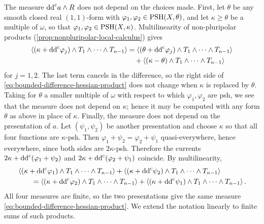 The measure $\mathrm{dd}^{\mathrm{c}} a\wedge R$ does not depend on the choices made. First, let $\theta$ be any smooth closed real $(1,1)$-form with $\varphi_1,\varphi_2\in\mathrm{PSH}(X,\theta)$, and let $\kappa\geq\theta$ be a multiple of $\omega$, so that $\varphi_1,\varphi_2\in\mathrm{PSH}(X,\kappa)$. Multilinearity of non-pluripolar products (\cref{prop:nonpluripolar-local-calculus}) gives
\[
 \begin{aligned}
 \left\langle(\kappa+\mathrm{dd}^{\mathrm{c}}\varphi_j)\wedge T_1\wedge\cdots\wedge T_{n-1}\right\rangle
 &=\left\langle(\theta+\mathrm{dd}^{\mathrm{c}}\varphi_j)\wedge T_1\wedge\cdots\wedge T_{n-1}\right\rangle\\
 &\quad+\left\langle(\kappa-\theta)\wedge T_1\wedge\cdots\wedge T_{n-1}\right\rangle
 \end{aligned}
\]
for $j=1,2$. The last term cancels in the difference, so the right side of \eqref{eq:bounded-difference-hessian-product} does not change when $\kappa$ is replaced by $\theta$. Taking for $\theta$ a smaller multiple of $\omega$ with respect to which $\varphi_1,\varphi_2$ are psh, we see that the measure does not depend on $\kappa$; hence it may be computed with any form $\theta$ as above in place of $\kappa$. Finally, the measure does not depend on the presentation of $a$. Let $(\psi_1,\psi_2)$ be another presentation and choose $\kappa$ so that all four functions are $\kappa$-psh. Then $\varphi_1+\psi_2=\varphi_2+\psi_1$ quasi-everywhere, hence everywhere, since both sides are $2\kappa$-psh. Therefore the currents $2\kappa+\mathrm{dd}^{\mathrm{c}}(\varphi_1+\psi_2)$ and $2\kappa+\mathrm{dd}^{\mathrm{c}}(\varphi_2+\psi_1)$ coincide. By multilinearity,
\[
 \begin{aligned}
 &\left\langle(\kappa+\mathrm{dd}^{\mathrm{c}}\varphi_1)\wedge T_1\wedge\cdots\wedge T_{n-1}\right\rangle
  +\left\langle(\kappa+\mathrm{dd}^{\mathrm{c}}\psi_2)\wedge T_1\wedge\cdots\wedge T_{n-1}\right\rangle\\
 &\qquad=\left\langle(\kappa+\mathrm{dd}^{\mathrm{c}}\varphi_2)\wedge T_1\wedge\cdots\wedge T_{n-1}\right\rangle
  +\left\langle(\kappa+\mathrm{dd}^{\mathrm{c}}\psi_1)\wedge T_1\wedge\cdots\wedge T_{n-1}\right\rangle.
 \end{aligned}
\]
All four measures are finite, so the two presentations give the same measure \eqref{eq:bounded-difference-hessian-product}. We extend the notation linearly to finite sums of such products.

